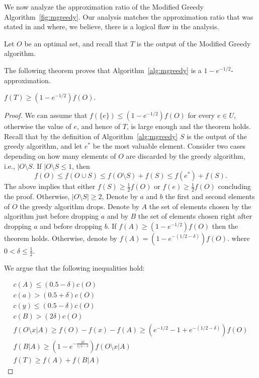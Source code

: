 We now analyze the approximation ratio of the
Modified Greedy Algorithm~\ref{fig:mgreedy}.
Our analysis matches the approximation ratio that was stated in
\cite{khuller1999budgeted} and \cite{krause2005note} where, we believe, 
there is a logical flaw in the analysis.


Let $O$ be an optimal set, and recall that $T$ is the output of the Modified Greedy algorithm.

The following theorem proves that Algorithm~\ref{alg:mgreedy} is a $1-e^{-1/2}$-approximation.

\begin{theorem}
	$f(T) \geq (1 - e^{-1/2})f(O)$.
\end{theorem}

\begin{proof}
	We can assume that $f(\{e\}) \leq (1 - e^{-1/2})f(O)$ for every $e \in U$, otherwise the value of $e$, and hence of $T$, is large enough and the theorem holds.
	Recall that by the definition of Algorithm~\ref{alg:mgreedy} $S$ is the output of the greedy algorithm, and let $e^*$ be the most valuable element.
	Consider two cases depending on how many elements of $O$ are discarded by the greedy algorithm, i.e., $|O \setminus S$.
	If $|O \setminus S \leq 1$, then 
	$$
	f(O) \leq f(O \cup S) \leq f(O \setminus S) + f(S) \leq f(e^*) + f(S).
	$$
	The above implies that either $f(S) \geq \frac{1}{2}f(O)$ or $f(e) \geq \frac{1}{2}f(O)$ concluding the proof.
	Otherwise, $|O \setminus S| \geq 2$,
	Denote by $a$ and $b$ the first and second elements of $O$ the greedy algorithm drops.
	Denote by $A$ the set of elements chosen by the algorithm just before dropping $a$ and by
	$B$ the set of elements chosen right after dropping $a$ and before dropping $b$.
	If $f(A) \geq (1 - e^{-1/2})f(O)$ then the theorem holds.
	Otherwise, denote by $f(A) = (1 - e^{-(1/2 - \delta)})f(O)$.
	where $0 < \delta \leq \frac{1}{2}$.

	We argue that the following inequalities hold:

	\begin{align}
		\label{mgreedy:ineq1}
		c(A) \leq (0.5 - \delta)c(O)
		\\
		\label{mgreedy:ineq2}
		c(a) > (0.5 + \delta)c(O)
		\\
		\label{mgreedy:ineq3}
		c(y) \leq (0.5 - \delta)c(O)
		\\
		\label{mgreedy:ineq4}
		c(B) > (2\delta)c(O)
		\\
		\label{ineq:T}
		f(O \setminus x | A) \geq f(O) - f(x) - f(A) \geq (e^{-1/2} - 1 + e^{-(1/2 - \delta)})f(O)
		\\
		\label{ineq:B}
		f(B|A) \geq (1 - e^{-\frac{2\delta}{1/2 - \delta}})f(O \setminus x | A)
		\\
		f(T) \geq f(A) + f(B|A)
	\end{align}


\end{proof}
